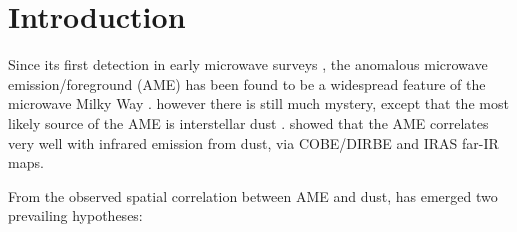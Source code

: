 \documentclass[preprint2,longabstract]{aastex}
\begin{document}
\begin{abstract}
\end{abstract}




\maketitle
\section{Introduction}

     Since its first detection in early microwave surveys , the anomalous microwave emission/foreground (AME) has been found to be a widespread feature of the microwave Milky Way \citep{dickinson13r}.  however there is still much mystery, except that the most likely source of the AME is interstellar dust \citep{ysard10a,tibbs11,hensley16}. \cite{kogut96,deoliveiracosta97,leitch98} showed that the AME correlates very well with infrared emission from dust, via COBE/DIRBE and IRAS far-IR maps.
     
 From the observed spatial correlation between AME and dust, has emerged two prevailing hypotheses: 
 
\end{document}
